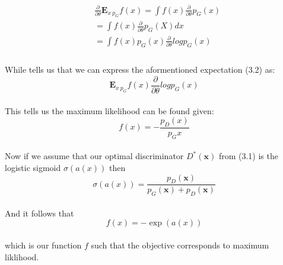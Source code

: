 \documentclass{amsart}
\numberwithin{equation}{section}
\theoremstyle{definition}
\theoremstyle{remark}
\begin{document}
\begin{equation}
\begin{aligned}
& \frac{\partial}{\partial \theta} \mathbf{E}_{x ~ p_G} f(x) = \int f(x) \frac{\partial}{\partial \theta} p_G(x) \\
& = \int f(x) \frac{\partial}{\partial \theta} p_G (X) dx \\
& = \int f(x) p_G(x) \frac{\partial}{\partial \theta} log {p_G}(x) \\
\end{aligned}
\end{equation}\\


While tells us that we can express the aformentioned expectation (3.2) as: \\

\begin{equation}
\mathbf{E}_{x ~ p_G} f(x) \frac{\partial}{\partial \theta} log {p_G}(x)
\end{equation} \\

This tells us the maximum likelihood can be found given: \\

\begin{equation}
f(x) = - \frac{p_D(x)}{p_G{x}}
\end{equation} \\

Now if we assume that our optimal discriminator $D^*(\mathbf{x})$ from (3.1) is the logistic sigmoid $\sigma(a(x))$ then \\

\begin{equation}
\sigma(a(x)) = \frac{p_D(\mathbf{x})}{p_G(\mathbf{x}) + p_D(\mathbf{x})}
\end{equation} \\

And it follows that \\

\begin{equation}
f(x) = -\exp(a(x))
\end{equation} \\

which is our function $f$ such that the objective corresponds to maximum liklihood.

\end{document}
